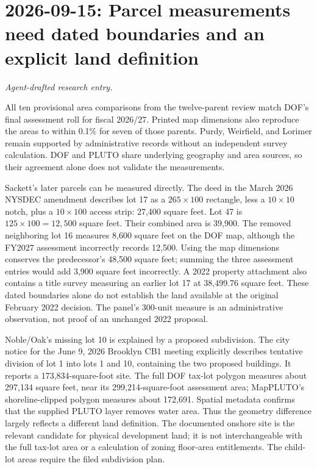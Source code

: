 \clearpage
\section*{2026-09-15: Parcel measurements need dated boundaries and an explicit land definition}
\textit{Agent-drafted research entry.}

All ten provisional area comparisons from the twelve-parent review match
DOF's final assessment roll for fiscal 2026/27. Printed map dimensions also
reproduce the areas to within 0.1\% for seven of those parents. Purdy,
Weirfield, and Lorimer remain supported by administrative records without an
independent survey calculation. DOF and PLUTO share underlying geography and
area sources, so their agreement alone does not validate the measurements.

Sackett's later parcels can be measured directly. The deed in the March 2026
NYSDEC amendment describes lot 17 as a $265\times100$ rectangle, less a
$10\times10$ notch, plus a $10\times100$ access strip: 27,400 square feet.
Lot 47 is $125\times100=12,500$ square feet. Their combined area is 39,900.
The removed neighboring lot 16 measures 8,600 square feet on the DOF map,
although the FY2027 assessment incorrectly records 12,500. Using the map
dimensions conserves the predecessor's 48,500 square feet; summing the three
assessment entries would add 3,900 square feet incorrectly. A 2022 property
attachment also contains a title survey measuring an earlier lot 17 at
38,499.76 square feet. These dated boundaries alone do not establish the land available at the
original February 2022 decision. The panel's 300-unit measure is an
administrative observation, not proof of an unchanged 2022 proposal.

Noble/Oak's missing lot 10 is explained by a proposed subdivision. The city
notice for the June 9, 2026 Brooklyn CB1 meeting explicitly describes tentative
division of lot 1 into lots 1 and 10, containing the two proposed buildings.
It reports a 173,834-square-foot site. The full DOF tax-lot polygon measures
about 297,134 square feet, near its 299,214-square-foot assessment area;
MapPLUTO's shoreline-clipped polygon measures about 172,691. Spatial metadata
confirms that the supplied PLUTO layer removes water area. Thus the geometry
difference largely reflects a different land definition. The documented
onshore site is the relevant candidate for physical development land; it is
not interchangeable with the full tax-lot area or a calculation of zoning
floor-area entitlements. The child-lot areas require the filed subdivision plan.

